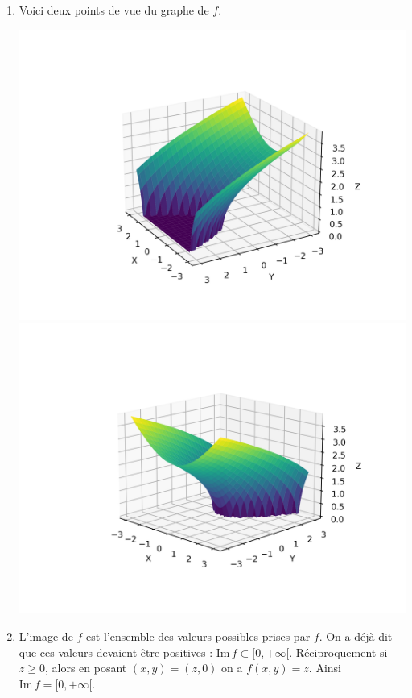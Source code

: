 \documentclass[11pt,a4paper]{article}
\renewcommand{\ge}{\geqslant} \renewcommand{\geq}{\geqslant}
\theoremstyle{exostyle}
\begin{document}
\begin{enumerate}
\begin{center}
\begin{tikzpicture}[scale=0.8]
\end{tikzpicture}
\end{center}
	
	
	\item Voici deux points de vue du graphe de $f$.
	
\begin{center}
	\hspace*{-2cm}
		\includegraphics[scale=0.6]{figures-exercices/fpv-fiche1-exo4-fig1}			
	\hspace*{-2cm}
		\includegraphics[scale=0.6]{figures-exercices/fpv-fiche1-exo4-fig2}		
\end{center}	
	
	\item L'image de $f$ est l'ensemble des valeurs possibles prises par $f$.
	On a déjà dit que ces valeurs devaient être positives : $\text{Im}\, f \subset [0,+\infty[$.
	Réciproquement si $z \ge 0$, alors en posant $(x,y) = (z,0)$ on a $f(x,y)=z$.
	Ainsi $\text{Im}\, f = [0,+\infty[$.
\end{enumerate}
\fincorrection
\finexercice
\end{document}
